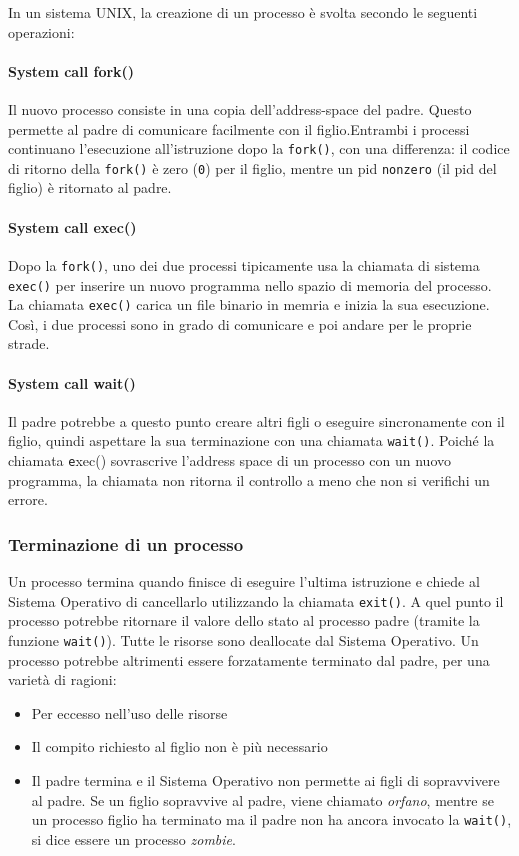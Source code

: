 \documentclass[a4paper]{article}
\begin{document}
In un sistema UNIX, la creazione di un processo è svolta secondo le seguenti operazioni:

\paragraph{System call fork()} Il nuovo processo consiste in una copia dell'address-space del padre. Questo permette al padre di comunicare facilmente con il figlio.Entrambi i processi continuano l'esecuzione all'istruzione dopo la \texttt{fork()}, con una differenza: il codice di ritorno della \texttt{fork()} è zero (\texttt{0}) per il figlio, mentre un pid \texttt{nonzero} (il pid del figlio) è ritornato al padre.
\paragraph{System call exec()} Dopo la \texttt{fork()}, uno dei due processi tipicamente usa la chiamata di sistema \texttt{exec()} per inserire un nuovo programma nello spazio di memoria del processo. La chiamata \texttt{exec()} carica un file binario in memria e inizia la sua esecuzione. Così, i due processi sono in grado di comunicare e poi andare per le proprie strade.
\paragraph{System call wait()} Il padre potrebbe a questo punto creare altri figli o eseguire sincronamente con il figlio, quindi aspettare la sua terminazione con una chiamata \texttt{wait()}. \newline
Poiché la chiamata \texttt exec() sovrascrive l'address space di un processo con un nuovo programma, la chiamata non ritorna il controllo a meno che non si verifichi un errore.

\subsubsection{Terminazione di un processo}
Un processo termina quando finisce di eseguire l'ultima istruzione e chiede al Sistema Operativo di cancellarlo utilizzando la chiamata \texttt{exit()}. A quel punto il processo potrebbe ritornare il valore dello stato al processo padre (tramite la funzione \texttt{wait()}). Tutte le risorse sono deallocate dal Sistema Operativo. \newline
Un processo potrebbe altrimenti essere forzatamente terminato dal padre, per una varietà di ragioni:
\begin{itemize}
   \item Per eccesso nell'uso delle risorse
   \item Il compito richiesto al figlio non è più necessario
   \item Il padre termina e il Sistema Operativo non permette ai figli di sopravvivere al padre. Se un figlio sopravvive al padre, viene chiamato \textit{orfano}, mentre se un processo figlio ha terminato ma il padre non ha ancora invocato la \texttt{wait()}, si dice essere un processo \textit{zombie}.
\end{itemize}
\end{document}
